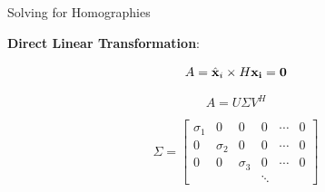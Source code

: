 \documentclass[serif]{beamer}
\begin{document}
\begin{frame}[t]{\sc Solving for Homographies}

\textbf{Direct Linear Transformation}:

\begin{center}

\vskip -0.15in
\begin{equation}
\label{DLT}
	A=\hat{\bf{x}}_{i} \times H \bf{x}_{i}=0
\end{equation}

\begin{equation}
\label{DLTSVD}
	A=U \Sigma V^{H}
\end{equation}

\begin{equation}
\label{SVD}
	\Sigma = \begin{bmatrix}\sigma_{1}&0&0&0&\cdots&0 \\ 0&\sigma_{2}&0&0&\cdots&0 \\ 0&0&\sigma_{3}&0&\cdots&0 \\ &&&\ddots&& \end{bmatrix}
\end{equation}

\end{center}

\end{frame}
\end{document}
